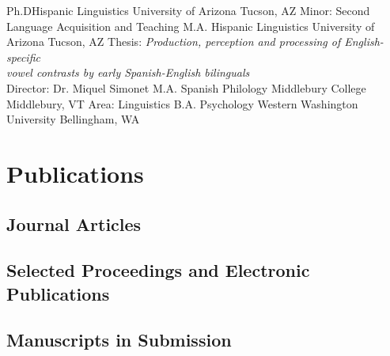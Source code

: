 \documentclass[12pt,letterpaper]{moderncv}
\begin{document}
        {Ph.D}{Hispanic Linguistics}
        {University of Arizona}
        {Tucson, AZ}
        {Minor: Second Language Acquisition and Teaching}
        {M.A.}
        {Hispanic Linguistics}
        {University of Arizona}
        {Tucson, AZ}
        {Thesis: \emph{Production, perception and processing of English-specific \\vowel contrasts by early Spanish-English bilinguals} \\ Director: Dr. Miquel Simonet}
        {M.A.}
        {Spanish Philology}
        {Middlebury College}
        {Middlebury, VT}
        {Area: Linguistics}
        {B.A.}
        {Psychology}
        {Western Washington University}
        {Bellingham, WA}
        {}









\section{Publications}

\nobibliography*
\newcommand{}

\subsection{Journal Articles}


\subsection{Selected Proceedings and Electronic Publications}

\subsection{Manuscripts in Submission}
\end{document}
